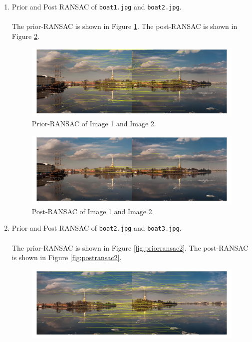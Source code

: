 \documentclass[english]{article}
\begin{document}
\begin{enumerate}
    \item Prior and Post RANSAC of \texttt{boat1.jpg} and \texttt{boat2.jpg}. \\\\The prior-RANSAC is shown in Figure \ref{fig:priorransac1}. The post-RANSAC is shown in Figure \ref{fig:postransac1}.
    \begin{figure}[H]
          \centering
          \includegraphics[width=1\textwidth]{priorransac1.jpg}
          \caption{Prior-RANSAC of Image 1 and Image 2.}
          \label{fig:priorransac1}
        \end{figure}
        \begin{figure}[H]
          \centering
          \includegraphics[width=1\textwidth]{postransac1.jpg}
          \caption{Post-RANSAC of Image 1 and Image 2.}
          \label{fig:postransac1}
        \end{figure}
    \item Prior and Post RANSAC of \texttt{boat2.jpg} and \texttt{boat3.jpg}. \\\\The prior-RANSAC is shown in Figure \ref{fig:priorransac2}. The post-RANSAC is shown in Figure \ref{fig:postransac2}.
    \begin{figure}[H]
          \centering
          \includegraphics[width=1\textwidth]{priorransac2.jpg}

\end{figure}
\end{enumerate}
\end{document}
